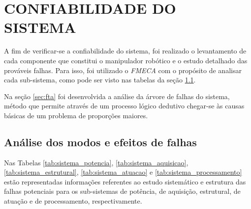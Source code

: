 \chapter{CONFIABILIDADE DO SISTEMA}
\label{chap:conf}
A fim de verificar-se a confiabilidade do sistema, foi realizado o levantamento de cada componente que constitui o manipulador robótico e o estudo detalhado das prováveis falhas. Para isso, foi utilizado o \textit{\acs{FMECA}} com o propósito de analisar cada sub-sistema, como pode ser visto nas tabelas da seção \ref{sec:fmeca}. 

Na seção \ref{sec:fta} foi desenvolvida a análise da árvore de falhas do sistema, método que permite através de um processo lógico dedutivo chegar-se às causas básicas de um problema de proporções maiores.

\section{Análise dos modos e efeitos de falhas}
\label{sec:fmeca}
  Nas Tabelas \ref{tab:sistema_potencia}, \ref{tab:sistema_aquisicao}, \ref{tab:sistema_estrutural}, \ref{tab:sistema_atuacao} e \ref{tab:sistema_processamento}  estão representadas informações referentes ao estudo sistemático e estrutura das falhas potenciais para os sub-sistemas de potência, de aquisição, estrutural, de atuação e de processamento, respectivamente. 



